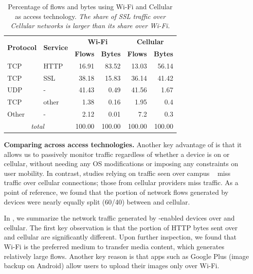 \begin{table}
\begin{center}
\begin{tabular}{|l|l|r|r|r|r|}
\hline
\multirow{2}{*}{\bf Protocol} & \multirow{2}{*}{\bf Service} & \multicolumn{2}{|c|}{\bf Wi-Fi} & \multicolumn{2}{|c|}{\bf Cellular} \tabularnewline
\cline{3-6}
           &           &  \textbf{Flows}  &  \textbf{Bytes}  &  \textbf{Flows}  &  \textbf{Bytes}  \tabularnewline
\hline
 TCP       &  HTTP     &  16.91  &  83.52  &  13.03  &  56.14  \tabularnewline
\hline
 TCP       &  SSL      &  38.18  &  15.83  &  36.14  &  41.42  \tabularnewline
\hline
UDP       &  -        &  41.43  &   0.49  &  41.56  &   1.67  \tabularnewline
\hline
TCP       &  other    &   1.38 &   0.16  &   1.95  &   0.4  \tabularnewline
\hline
Other     &  -        &   2.12  &  0.01  &   7.2  &   0.3  \tabularnewline
\hline
\multicolumn{2}{|c|}{\emph{total}} & 100.00 & 100.00 & 100.00 & 100.00 \tabularnewline
\hline
\end{tabular}
\end{center}
\caption{Percentage of flows and bytes using Wi-Fi and Cellular as access technology.  \emph{The share of SSL traffic over Cellular
    networks is larger than its share over Wi-Fi.}}  
\label{tab:summaryWifiCellularTraffic}
\end{table}


\noindent\textbf{Comparing across access technologies.} Another 
key advantage of \meddle is that it allows us to passively monitor traffic 
regardless of whether a device is on \wifi or cellular, without 
needing any OS modifications or imposing any constraints on 
user mobility. In contrast, studies relying on traffic seen over campus \wifi~\cite{chen:wifi} miss traffic 
over cellular connections; those from cellular providers miss \wifi traffic. 
As a point of reference, we found that the portion of network flows 
generated by devices were nearly equally split (60/40) between 
\wifi and cellular.

In , we summarize the network 
traffic generated by \meddle-enabled devices over \wifi and cellular.
The first key observation is that the portion of HTTP bytes sent over \wifi and cellular 
are significantly different. Upon further inspection, we found that Wi-Fi is the
preferred medium to transfer media content, which generates relatively large flows. 
Another key reason is that apps such as
Google Plus (image backup on Android) allow users to upload their
images only over Wi-Fi. 

